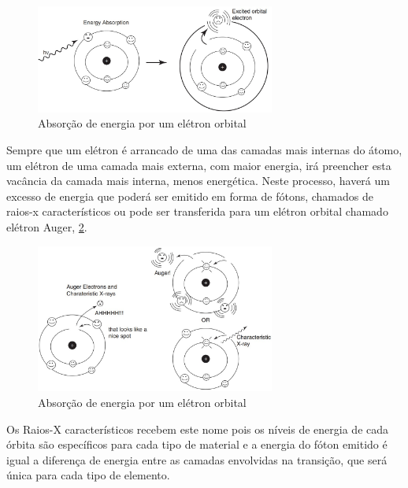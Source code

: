 \documentclass[11pt,a4paper]{article}
\begin{document}
                \begin{figure}[h]
                    \centering
                    \includegraphics[width=0.7\textwidth]{Imagens/absorcaoDeEnergiaPorEletronOrbital.jpg}
                    \caption{Absorção de energia por um elétron orbital}
                    \label{fig:absorcaoDeEnergiaPorEletronOrbital}
                \end{figure}

                Sempre que um elétron é arrancado de uma das camadas mais internas do átomo, um elétron de uma camada mais externa, com maior energia, irá preencher esta vacância da camada mais interna, menos energética. Neste processo, haverá um excesso de energia que poderá ser emitido em forma de fótons, chamados de raios-x característicos ou pode ser transferida para um elétron orbital chamado elétron Auger, \ref{fig:emissaoRaiosXCaracteristicosEEletronAuger}.

                \begin{figure}[h]
                    \centering
                    \includegraphics[width=0.7\textwidth]{Imagens/emissaoRaiosXCaracteristicosEEletronAuger.jpg}
                    \caption{Absorção de energia por um elétron orbital}
                    \label{fig:emissaoRaiosXCaracteristicosEEletronAuger}
                \end{figure}

                Os Raios-X característicos recebem este nome pois os níveis de energia de cada órbita são específicos para cada tipo de material e a energia do fóton emitido é igual a diferença de energia entre as camadas envolvidas na transição, que será única para cada tipo de elemento.
                
\end{document}
